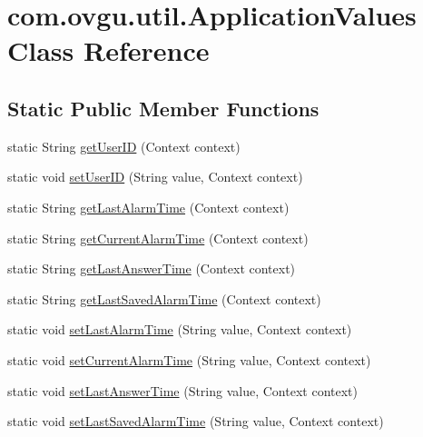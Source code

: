 \hypertarget{classcom_1_1ovgu_1_1util_1_1_application_values}{\section{com.\-ovgu.\-util.\-Application\-Values Class Reference}
\label{classcom_1_1ovgu_1_1util_1_1_application_values}
}
\subsection*{Static Public Member Functions}
\begin{DoxyCompactItemize}
\item 
static String \hyperlink{classcom_1_1ovgu_1_1util_1_1_application_values_a4eebfffba2fc91d80f48deda585953bc}{get\-User\-I\-D} (Context context)
\item 
static void \hyperlink{classcom_1_1ovgu_1_1util_1_1_application_values_a09b3de9a79ab45a6393d364b07e20627}{set\-User\-I\-D} (String value, Context context)
\item 
static String \hyperlink{classcom_1_1ovgu_1_1util_1_1_application_values_aec3673a7d1632fc141ba742047f3bc06}{get\-Last\-Alarm\-Time} (Context context)
\item 
static String \hyperlink{classcom_1_1ovgu_1_1util_1_1_application_values_a232b2f372590cfbd85e98916efbad8c1}{get\-Current\-Alarm\-Time} (Context context)
\item 
static String \hyperlink{classcom_1_1ovgu_1_1util_1_1_application_values_a4dfdb4c445f315a7a4cc3241d6df12e6}{get\-Last\-Answer\-Time} (Context context)
\item 
static String \hyperlink{classcom_1_1ovgu_1_1util_1_1_application_values_ac19ce8d0b9de71a3dc65e23b46b11384}{get\-Last\-Saved\-Alarm\-Time} (Context context)
\item 
static void \hyperlink{classcom_1_1ovgu_1_1util_1_1_application_values_ac6e150512a0407c0439d7c0280214417}{set\-Last\-Alarm\-Time} (String value, Context context)
\item 
static void \hyperlink{classcom_1_1ovgu_1_1util_1_1_application_values_a09dc19f803061c2455bab0d01de7bde3}{set\-Current\-Alarm\-Time} (String value, Context context)
\item 
static void \hyperlink{classcom_1_1ovgu_1_1util_1_1_application_values_afbbd12a2b85ebcccfdaa296e8a8ed6b8}{set\-Last\-Answer\-Time} (String value, Context context)
\item 
static void \hyperlink{classcom_1_1ovgu_1_1util_1_1_application_values_a90f4f75a9fcbd610dfd56ef45b15f6b6}{set\-Last\-Saved\-Alarm\-Time} (String value, Context context)
\end{DoxyCompactItemize}



